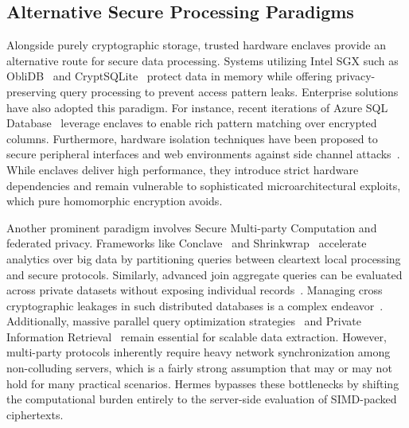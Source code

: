 \documentclass[sigconf,nonacm]{acmart}
\begin{document}
\subsection{Alternative Secure Processing Paradigms}

Alongside purely cryptographic storage, trusted hardware enclaves provide an alternative route for secure data processing. Systems utilizing Intel SGX such as ObliDB~\cite{10.14778/3364324.3364331} and CryptSQLite~\cite{8946540} protect data in memory while offering privacy-preserving query processing to prevent access pattern leaks. Enterprise solutions have also adopted this paradigm. For instance, recent iterations of Azure SQL Database~\cite{10.1145/3318464.3386141} leverage enclaves to enable rich pattern matching over encrypted columns. Furthermore, hardware isolation techniques have been proposed to secure peripheral interfaces and web environments against side channel attacks~\cite{8835331}. While enclaves deliver high performance, they introduce strict hardware dependencies and remain vulnerable to sophisticated microarchitectural exploits, which pure homomorphic encryption avoids.

Another prominent paradigm involves Secure Multi-party Computation and federated privacy. Frameworks like Conclave~\cite{10.1145/3302424.3303982} and Shrinkwrap~\cite{10.14778/3291264.3291274} accelerate analytics over big data by partitioning queries between cleartext local processing and secure protocols. Similarly, advanced join aggregate queries can be evaluated across private datasets without exposing individual records~\cite{10.1145/3448016.3452808}. Managing cross cryptographic leakages in such distributed databases is a complex endeavor~\cite{10598104}. Additionally, massive parallel query optimization strategies~\cite{10.1145/2038916.2038928} and Private Information Retrieval~\cite{10.1109/TKDE.2012.90} remain essential for scalable data extraction. However, multi-party protocols inherently require heavy network synchronization among non-colluding servers, which is a fairly strong assumption that may or may not hold for many practical scenarios. Hermes bypasses these bottlenecks by shifting the computational burden entirely to the server-side evaluation of SIMD-packed ciphertexts.

\end{document}

